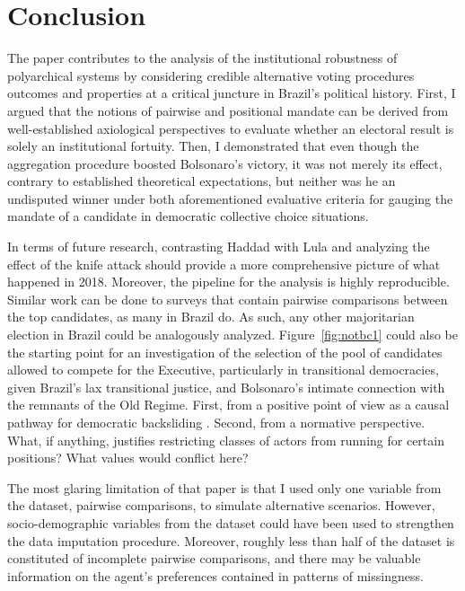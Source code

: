 \documentclass[hidelinks,11pt]{article} \usepackage[utf8]{inputenc}
\begin{document}
\section{Conclusion}

The paper contributes to the analysis of the institutional robustness of
polyarchical systems by considering credible alternative voting procedures
outcomes and properties at a critical juncture in Brazil's political history.
First, I argued that the notions of pairwise and positional mandate can be
derived from well-established axiological perspectives to evaluate whether an
electoral result is solely an institutional fortuity. Then, I demonstrated that
even though the aggregation procedure boosted Bolsonaro's victory, it was not
merely its effect, contrary to established theoretical expectations, but neither
was he an undisputed winner under both aforementioned evaluative criteria for
gauging the mandate of a candidate in democratic collective choice situations.

In terms of future research, contrasting Haddad with Lula and analyzing the
effect of the knife attack should provide a more comprehensive picture of what
happened in 2018. Moreover, the pipeline for the analysis is highly
reproducible. Similar work can be done to surveys that contain pairwise
comparisons between the top candidates, as many in Brazil do. As such, any other
majoritarian election in Brazil could be analogously analyzed.
Figure~\ref{fig:notbc1} could also be the starting point for an investigation of
the selection of the pool of candidates allowed to compete for the Executive,
particularly in transitional democracies, given Brazil's lax transitional
justice, and Bolsonaro's intimate connection with the remnants of the Old
Regime. First, from a positive point of view as a causal pathway for democratic
backsliding \parencite{svolik2008authoritarian, nalepa2022after}. Second, from a
normative perspective. What, if anything, justifies restricting classes of
actors from running for certain positions? What values would conflict here?

The most glaring limitation of that paper is that I used only one variable from
the dataset, pairwise comparisons, to simulate alternative scenarios. However,
socio-demographic variables from the dataset could have been used to strengthen
the data imputation procedure. Moreover, roughly less than half of the dataset
is constituted of incomplete pairwise comparisons, and there may be valuable
information on the agent's preferences contained in patterns of missingness.
\end{document}
